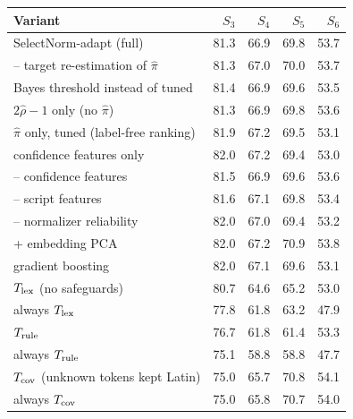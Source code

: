 \begin{tabular}{@{}lrrrr@{}}\toprule
Variant & $S_3$ & $S_4$ & $S_5$ & $S_6$\\\midrule
SelectNorm-adapt (full) & 81.3 & 66.9 & 69.8 & 53.7\\
\quad -- target re-estimation of $\hat\pi$ & 81.3 & 67.0 & 70.0 & 53.7\\
\quad Bayes threshold instead of tuned & 81.4 & 66.9 & 69.6 & 53.5\\
\quad $2\hat\rho-1$ only (no $\hat\pi$) & 81.3 & 66.9 & 69.8 & 53.6\\
\quad $\hat\pi$ only, tuned (label-free ranking) & 81.9 & 67.2 & 69.5 & 53.1\\
\quad confidence features only & 82.0 & 67.2 & 69.4 & 53.0\\
\quad -- confidence features & 81.5 & 66.9 & 69.6 & 53.6\\
\quad -- script features & 81.6 & 67.1 & 69.8 & 53.4\\
\quad -- normalizer reliability & 82.0 & 67.0 & 69.4 & 53.2\\
\quad + embedding PCA & 82.0 & 67.2 & 70.9 & 53.8\\
\quad gradient boosting & 82.0 & 67.1 & 69.6 & 53.1\\
\quad $T_{\rm lex}$ (no safeguards) & 80.7 & 64.6 & 65.2 & 53.0\\
\quad always $T_{\rm lex}$ & 77.8 & 61.8 & 63.2 & 47.9\\
\quad $T_{\rm rule}$ & 76.7 & 61.8 & 61.4 & 53.3\\
\quad always $T_{\rm rule}$ & 75.1 & 58.8 & 58.8 & 47.7\\
\quad $T_{\rm cov}$ (unknown tokens kept Latin) & 75.0 & 65.7 & 70.8 & 54.1\\
\quad always $T_{\rm cov}$ & 75.0 & 65.8 & 70.7 & 54.0\\
\bottomrule\end{tabular}
